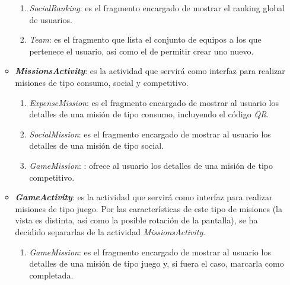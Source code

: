 \documentclass[twoside]{report}
\begin{document}
\begin{enumerate}
\begin{itemize}
\begin{enumerate}
			\item \textit{SocialRanking}: es el fragmento encargado de mostrar el ranking global de usuarios.
			
			\item \textit{Team}: es el fragmento que lista el conjunto de equipos a los que pertenece el usuario, así como el de permitir crear uno nuevo.
		\end{enumerate}
		
	\item \textbf{\textit{MissionsActivity}}: es la actividad que servirá como interfaz para realizar misiones de tipo consumo, social y competitivo. 
	
		\begin{enumerate}
		\item \textit{ExpenseMission}: es el fragmento encargado de mostrar al usuario los detalles de una misión de tipo consumo, incluyendo el código \textit{QR}.
		
		\item \textit{SocialMission}: es el fragmento encargado de mostrar al usuario los detalles de una misión de tipo social.
		\item \textit{GameMission}: : ofrece al usuario los detalles de una misión de tipo competitivo.
		\end{enumerate}
		
	\item \textbf{\textit{GameActivity}}: es la actividad que servirá como interfaz para realizar misiones de tipo juego. Por las características de este tipo de misiones (la vista es distinta, así como la posible rotación de la pantalla), se ha decidido separarlas de la actividad \textit{MissionsActivity}.
	\begin{enumerate}
		\item \textit{GameMission}: es el fragmento encargado de mostrar al usuario los detalles de una misión de tipo juego y, si fuera el caso, marcarla como completada.
		\end{enumerate}
	
	

\end{itemize}
\end{enumerate}
\end{document}
